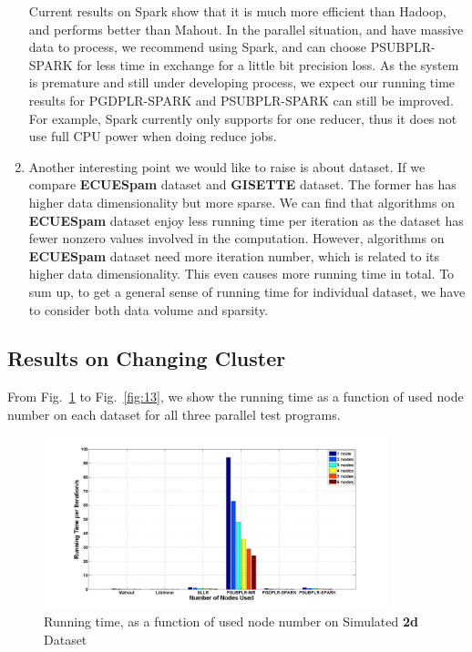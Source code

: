 \documentclass{llncs}
\begin{document}
\begin{enumerate}
          Current results on Spark show that it is much more efficient than Hadoop, and performs better than Mahout.
          In the parallel situation, and have massive data to process, we recommend using Spark, and can choose PSUBPLR-SPARK for less time in exchange for a little bit precision loss.
          As the system is premature and still under developing process, we expect our running time results for PGDPLR-SPARK and PSUBPLR-SPARK can still be improved.
          For example, Spark currently only supports for one reducer, thus it does not use full CPU power when doing reduce jobs.
    \item Another interesting point we would like to raise is about dataset. If we compare \textbf{ECUESpam} dataset and \textbf{GISETTE} dataset.
          The former has has higher data dimensionality but more sparse.
          We can find that algorithms on \textbf{ECUESpam} dataset enjoy less running time per iteration as the dataset has fewer nonzero values involved in the computation.
          However, algorithms on \textbf{ECUESpam} dataset need more iteration number, which is related to its higher data dimensionality. This even causes more running time in total.
          To sum up, to get a general sense of running time for individual dataset, we have to consider both data volume and sparsity.
\end{enumerate}

\subsection{Results on Changing Cluster}
From Fig.~\ref{fig:09} to Fig.~\ref{fig:13}, we show the running time as a function of used node number on each dataset for all three parallel test programs.
\begin{figure}[tb] \label{fig:09}
\center \includegraphics[height=5cm,width=10cm]{img/2d_time.png}
\caption{Running time, as a function of used node number on Simulated \textbf{2d} Dataset}
\end{figure}
\end{document}
